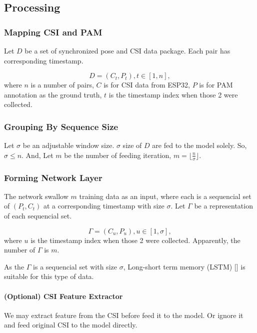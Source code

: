 \documentclass[10pt,letterpaper]{article}
\begin{document}
\subsection*{Processing}


\subsubsection*{Mapping CSI and PAM}
Let $D$ be a set of synchronized pose and CSI data package. Each pair has corresponding timestamp.

\begin{equation}
D =  {(C_t, P_t), t \in [1, n]},
\label{eq:Dataset}
\end{equation} where  $n$ is a number of pairs, $C$ is for CSI data from ESP32, $P$ is for PAM annotation as the ground truth, $t$ is the timestamp index when those 2 were collected.



\subsubsection*{Grouping By Sequence Size}

Let $\sigma$ be an adjustable window size. $\sigma$ size of $D$ are fed to the model solely. So,  $\sigma \le n$. And, Let $m$ be the number of feeding iteration, $m = \lfloor \frac{n}{\sigma} \rfloor$.


\subsubsection*{Forming Network Layer}

The network swallow $m$ training data as an input, where each is a sequencial set of $(P_t,C_t)$ at a corresponding timestamp with size $\sigma$.
Let $\Gamma$ be a representation of each sequencial set.

\begin{equation}
\Gamma =  {(C_u, P_u), u \in [1, \sigma]},
\label{eq:SubDataset}
\end{equation}
where $u$ is the timestamp index when those 2 were collected. Apparently, the number of $\Gamma$ is $m$.

As the $\Gamma$ is a sequencial set with size $\sigma$, Long-short term memory (LSTM) [] is suitable for this type of data.

\paragraph*{(Optional) CSI Feature Extractor}
We may extract feature from the CSI before feed it to the model. Or ignore it and feed original CSI to the model directly.
\end{document}
